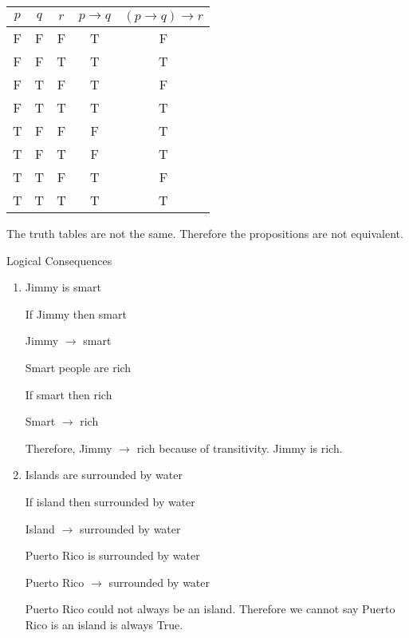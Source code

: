 \documentclass[11pt]{article}
\begin{document}
\begin{enumerate}
\begin{center}
\begin{tabular}{|c|c|c|c|c|}
\hline
$p$ & $q$ & $r$ & $p \rightarrow q$ & $(p \rightarrow q) \rightarrow r$\\
\hline
F & F & F & T & F\\
F & F & T & T & T\\
F & T & F & T & F\\
F & T & T & T & T\\
T & F & F & F & T\\
T & F & T & F & T\\
T & T & F & T & F\\
T & T & T & T & T\\
\hline
\end{tabular}
\end{center}

The truth tables are not the same. Therefore the propositions are not equivalent.

\end{enumerate}

Logical Consequences

\begin{enumerate}

\item
Jimmy is smart

If Jimmy then smart

Jimmy $\rightarrow$ smart

Smart people are rich

If smart then rich

Smart $\rightarrow$ rich

Therefore, Jimmy $\rightarrow$ rich because of transitivity. Jimmy is rich.

\item
Islands are surrounded by water

If island then surrounded by water

Island $\rightarrow$ surrounded by water

Puerto Rico is surrounded by water

Puerto Rico $\rightarrow$ surrounded by water

Puerto Rico could not always be an island. Therefore we cannot say Puerto Rico is an island is always True. 


\end{enumerate}
\end{document}
